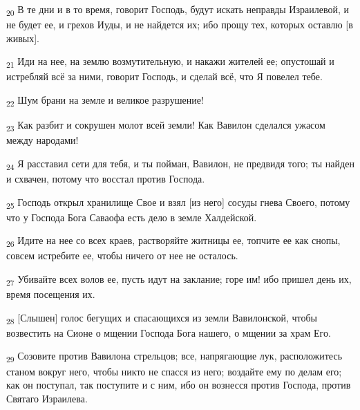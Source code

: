 \begin{tcolorbox}
\textsubscript{20} В те дни и в то время, говорит Господь, будут искать неправды Израилевой, и не будет ее, и грехов Иуды, и не найдется их; ибо прощу тех, которых оставлю [в живых].
\end{tcolorbox}
\begin{tcolorbox}
\textsubscript{21} Иди на нее, на землю возмутительную, и накажи жителей ее; опустошай и истребляй всё за ними, говорит Господь, и сделай всё, что Я повелел тебе.
\end{tcolorbox}
\begin{tcolorbox}
\textsubscript{22} Шум брани на земле и великое разрушение!
\end{tcolorbox}
\begin{tcolorbox}
\textsubscript{23} Как разбит и сокрушен молот всей земли! Как Вавилон сделался ужасом между народами!
\end{tcolorbox}
\begin{tcolorbox}
\textsubscript{24} Я расставил сети для тебя, и ты пойман, Вавилон, не предвидя того; ты найден и схвачен, потому что восстал против Господа.
\end{tcolorbox}
\begin{tcolorbox}
\textsubscript{25} Господь открыл хранилище Свое и взял [из него] сосуды гнева Своего, потому что у Господа Бога Саваофа есть дело в земле Халдейской.
\end{tcolorbox}
\begin{tcolorbox}
\textsubscript{26} Идите на нее со всех краев, растворяйте житницы ее, топчите ее как снопы, совсем истребите ее, чтобы ничего от нее не осталось.
\end{tcolorbox}
\begin{tcolorbox}
\textsubscript{27} Убивайте всех волов ее, пусть идут на заклание; горе им! ибо пришел день их, время посещения их.
\end{tcolorbox}
\begin{tcolorbox}
\textsubscript{28} [Слышен] голос бегущих и спасающихся из земли Вавилонской, чтобы возвестить на Сионе о мщении Господа Бога нашего, о мщении за храм Его.
\end{tcolorbox}
\begin{tcolorbox}
\textsubscript{29} Созовите против Вавилона стрельцов; все, напрягающие лук, расположитесь станом вокруг него, чтобы никто не спасся из него; воздайте ему по делам его; как он поступал, так поступите и с ним, ибо он вознесся против Господа, против Святаго Израилева.
\end{tcolorbox}
